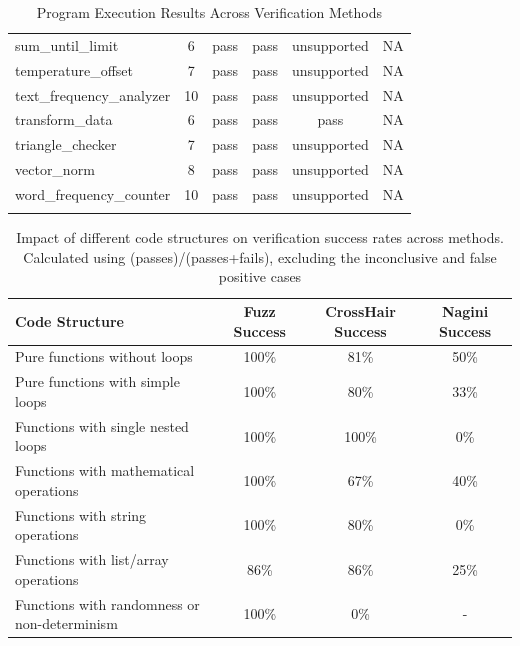 \documentclass[8pt]{extarticle}
\begin{document}
\begin{longtable}{|l|c|c|c|c|c|}
sum\_until\_limit & 6 & pass & pass & unsupported & NA \\
temperature\_offset & 7 & pass & pass & unsupported & NA \\
text\_frequency\_analyzer & 10 & pass & pass & unsupported & NA \\
transform\_data & 6 & pass & pass & pass & NA \\
triangle\_checker & 7 & pass & pass & unsupported & NA \\
vector\_norm & 8 & pass & pass & unsupported & NA \\
word\_frequency\_counter & 10 & pass & pass & unsupported & NA \\
\hline
\caption{Program Execution Results Across Verification Methods\label{tab:program-results}}
\end{longtable}

\begin{table}[H]
\centering
\begin{tabular}{|l|c|c|c|}
\hline
\textbf{Code Structure} & \textbf{Fuzz Success} & \textbf{CrossHair Success} & \textbf{Nagini Success} \\
\hline
Pure functions without loops & 100\% & 81\% & 50\% \\
\hline
Pure functions with simple loops & 100\% & 80\% & 33\% \\
\hline
Functions with single nested loops & 100\% & 100\% & 0\% \\
\hline
Functions with mathematical operations & 100\% & 67\% & 40\% \\
\hline
Functions with string operations & 100\% & 80\% & 0\% \\
\hline
Functions with list/array operations & 86\% & 86\% & 25\% \\
\hline
Functions with randomness or non-determinism & 100\% & 0\% & - \\
\hline
\end{tabular}
\caption{Impact of different code structures on verification success rates across methods. Calculated using (passes)/(passes+fails), excluding the inconclusive and false positive cases}
\label{tab:code-structure-impact}
\end{table}
\end{document}
